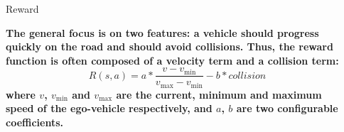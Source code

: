 \documentclass[final]{beamer}
\newlength{\sepwid}
\newlength{\onecolwid}
\begin{document}
\begin{frame}[t]
\begin{columns}[t]
\begin{column}{\sepwid}\end{column}
\begin{column}{\onecolwid} %
\vspace{1em}

 \begin{block}{Reward}

\textbf{The general focus is on two features: a vehicle should progress quickly on the road and should avoid collisions. Thus, the reward function is often composed of a velocity term and a collision term:\\ 
\begin{equation}
    R(s,a) = a * \frac{v - {v}_{\min}}{{v}_{\max}-{v}_{\min}} - b * {collision}
\end{equation}
where  $v$, ${v}_{\min}$ and ${v}_{\max}$  are the current, minimum and maximum speed of the ego-vehicle respectively, and  $a$, $b$  are two configurable coefficients.}

 \end{block}
               

\end{column}
\end{columns}
\end{frame}
\end{document}
